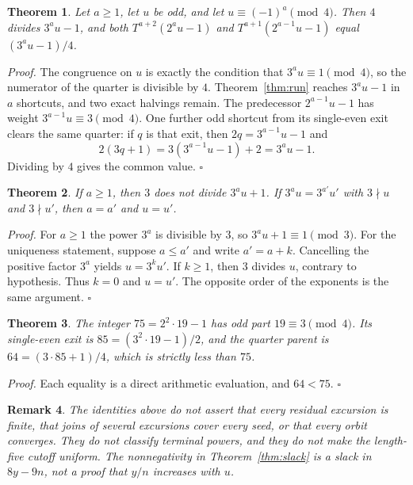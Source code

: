 \documentclass[11pt,letterpaper]{article}
\newtheorem{theorem}{Theorem}
\newtheorem{remark}[theorem]{Remark}
\newenvironment{proof}{\noindent\textit{Proof.}}{\hfill\(\square\)}
\begin{document}
\begin{theorem}
\label{thm:meeting}
Let \(a\ge 1\), let \(u\) be odd, and let \(u\equiv(-1)^a\pmod{4}\). Then \(4\) divides \(3^a u-1\), and both \(T^{a+2}(2^a u-1)\) and \(T^{a+1}(2^{a-1}u-1)\) equal \((3^a u-1)/4\).
\end{theorem}

\begin{proof}
The congruence on \(u\) is exactly the condition that \(3^a u\equiv 1\pmod{4}\), so the numerator of the quarter is divisible by \(4\). Theorem~\ref{thm:run} reaches \(3^a u-1\) in \(a\) shortcuts, and two exact halvings remain. The predecessor \(2^{a-1}u-1\) has weight \(3^{a-1}u\equiv 3\pmod{4}\). One further odd shortcut from its single-even exit clears the same quarter: if \(q\) is that exit, then \(2q=3^{a-1}u-1\) and
\[
2(3q+1)=3(3^{a-1}u-1)+2=3^a u-1.
\]
Dividing by \(4\) gives the common value.
\end{proof}

\begin{theorem}
\label{thm:free}
If \(a\ge 1\), then \(3\) does not divide \(3^a u+1\). If \(3^a u=3^{a'}u'\) with \(3\nmid u\) and \(3\nmid u'\), then \(a=a'\) and \(u=u'\).
\end{theorem}

\begin{proof}
For \(a\ge 1\) the power \(3^a\) is divisible by \(3\), so \(3^a u+1\equiv 1\pmod{3}\). For the uniqueness statement, suppose \(a\le a'\) and write \(a'=a+k\). Cancelling the positive factor \(3^a\) yields \(u=3^k u'\). If \(k\ge 1\), then \(3\) divides \(u\), contrary to hypothesis. Thus \(k=0\) and \(u=u'\). The opposite order of the exponents is the same argument.
\end{proof}

\begin{theorem}
\label{thm:example}
The integer \(75=2^2\cdot 19-1\) has odd part \(19\equiv 3\pmod{4}\). Its single-even exit is \(85=(3^2\cdot 19-1)/2\), and the quarter parent is \(64=(3\cdot 85+1)/4\), which is strictly less than \(75\).
\end{theorem}

\begin{proof}
Each equality is a direct arithmetic evaluation, and \(64<75\).
\end{proof}

\begin{remark}
The identities above do not assert that every residual excursion is finite, that joins of several excursions cover every seed, or that every orbit converges. They do not classify terminal powers, and they do not make the length-five cutoff uniform. The nonnegativity in Theorem~\ref{thm:slack} is a slack in \(8y-9n\), not a proof that \(y/n\) increases with \(u\).
\end{remark}
\end{document}
